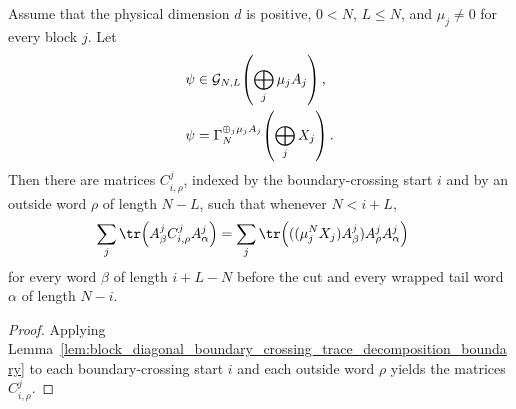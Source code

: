 \begin{lemma}
    \label{lem:block_diagonal_boundary_crossing_trace_decompositions_boundary}
    \leanok
    Assume that the physical dimension $d$ is positive, $0<N$, $L\le N$, and
    $\mu_j\ne0$ for every block $j$. Let
    \begin{align}
        \psi
         & \in
        \mathcal G_{N,L}\!\left(\bigoplus_j\mu_jA_j\right),
        \notag \\
        \psi
         & =
        \Gamma_N^{\oplus_j\mu_jA_j}\!\left(\bigoplus_jX_j\right).
        \notag
    \end{align}
    Then there are matrices $C^j_{i,\rho}$, indexed by the boundary-crossing
    start $i$ and by an outside word $\rho$ of length $N-L$, such that whenever
    $N<i+L$,
    \begin{align}
        \sum_j\tr\!\left(A^j_\beta C^j_{i,\rho}A^j_\alpha\right)
         & =
        \sum_j\tr\!\left(((\mu_j^NX_j)A^j_\beta)A^j_\rho A^j_\alpha\right)
        \notag
    \end{align}
    for every word $\beta$ of length $i+L-N$ before the cut and every wrapped
    tail word $\alpha$ of length $N-i$.
\end{lemma}

\begin{proof}
    \leanok
    Applying
    Lemma~\ref{lem:block_diagonal_boundary_crossing_trace_decomposition_boundary}
    to each boundary-crossing start $i$ and each outside word $\rho$ yields
    the matrices $C^j_{i,\rho}$.
\end{proof}

